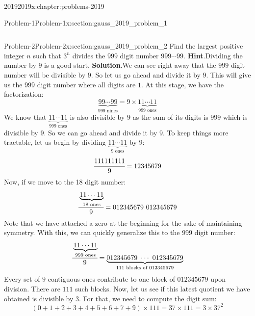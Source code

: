 \documentclass[oneside,10pt,]{book}
\newcommand{\blocktitlefont}{\relax}
\numberwithin{equation}{section}
\begin{document}
\begin{chapterptx}{2019}{}{2019}{}{}{x:chapter:problems-2019}
\begin{sectionptx}{Problem-1}{}{Problem-1}{}{}{x:section:gauss_2019_problem_1}
\begin{enumerate}
\begin{equation*}
\end{equation*}
%
\end{enumerate}
%
\end{sectionptx}
%
%
\typeout{************************************************}
\typeout{************************************************}
%
\begin{sectionptx}{Problem-2}{}{Problem-2}{}{}{x:section:gauss_2019_problem_2}
Find the largest positive integer \(n\) such that \(3^{n}\) divides the \(999\) digit number \(999\cdots99\).%
\textbf{\blocktitlefont Hint}.\quad{}Dividing the number by \(9\) is a good start.%
\textbf{\blocktitlefont Solution}.\quad{}We can see right away that the \(999\) digit number will be divisible by \(9\). So let us go ahead and divide it by \(9\). This will give us the \(999\) digit number where all digits are \(1\). At this stage, we have the factorization:%
\begin{equation*}
\underbrace{99 \cdots 99}_{999 \text{ nines}} = 9 \times \underbrace{11 \cdots 11}_{999 \text{ ones}}
\end{equation*}
We know that \(\underbrace{11 \cdots 11}_{999 \text{ ones}}\) is also divisible by \(9\) as the sum of its digits is \(999\) which is divisible by \(9\). So we can go ahead and divide it by \(9\). To keep things more tractable, let us begin by dividing \(\underbrace{11 \cdots 11}_{9 \text{ ones}}\) by \(9\):%
\begin{equation*}
\cfrac{111111111}{9} = 12345679
\end{equation*}
Now, if we move to the \textdollar{}18\textdollar{} digit number:%
\begin{equation*}
\cfrac{\underbrace{11 \cdots 11}_{18 \text{ ones}}}{9} = 012345679\ 012345679
\end{equation*}
Note that we have attached a zero at the beginning for the sake of maintaining symmetry. With this, we can quickly generalize this to the \(999\) digit number:%
\begin{equation*}
\cfrac{\underbrace{11 \cdots 11}_{999 \text{ ones}}}{9} = \underbrace{012345679\ \cdots\ 012345679}_{111 \text{ blocks of } 012345679}
\end{equation*}
Every set of \(9\) contiguous ones contribute to one block of \(012345679\) upon division. There are \(111\) such blocks. Now, let us see if this latest quotient we have obtained is divisible by \(3\). For that, we need to compute the digit sum:%
\begin{equation*}
(0 + 1 + 2 + 3 + 4 + 5 + 6 + 7 + 9) \times 111 = 37 \times 111 = 3 \times 37^2

\end{equation*}
\end{sectionptx}
\end{chapterptx}
\end{document}
